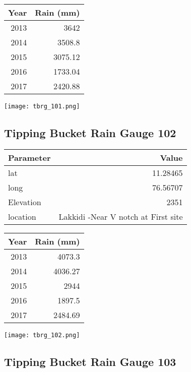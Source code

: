 \documentclass[a4paper]{article}
\begin{document}
\begin{center}
\begin{tabular}{rr}
Year & Rain (mm)\\
\hline
2013 & 3642\\
2014 & 3508.8\\
2015 & 3075.12\\
2016 & 1733.04\\
2017 & 2420.88\\
\end{tabular}
\end{center}

\begin{center}
\texttt{[image: tbrg\_101.png]}
\end{center}

\newpage


\subsection*{Tipping Bucket Rain Gauge 102}
\label{sec:org4dbb9ca}

\begin{center}
\begin{tabular}{lr}
Parameter & Value\\
\hline
lat & 11.28465\\
long & 76.56707\\
Elevation & 2351\\
location & Lakkidi -Near V notch at First site\\
\end{tabular}
\end{center}

\begin{center}
\begin{tabular}{rr}
Year & Rain (mm)\\
\hline
2013 & 4073.3\\
2014 & 4036.27\\
2015 & 2944\\
2016 & 1897.5\\
2017 & 2484.69\\
\end{tabular}
\end{center}

\begin{center}
\texttt{[image: tbrg\_102.png]}
\end{center}

\newpage

\subsection*{Tipping Bucket Rain Gauge 103}
\label{sec:orgf2c6a0b}
\end{document}

